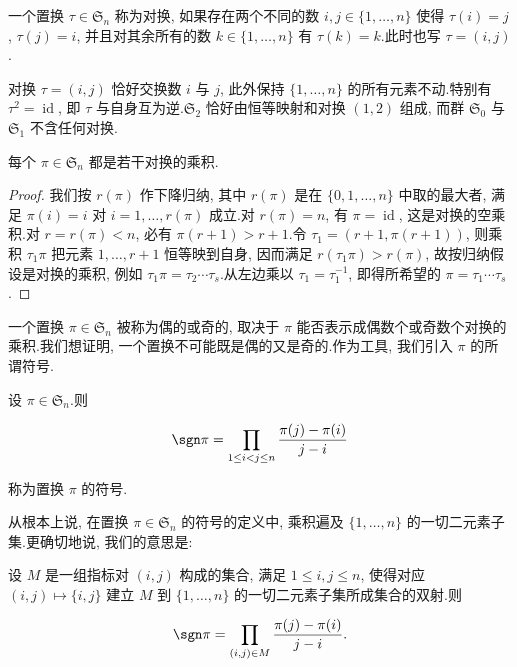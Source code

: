 \begin{definition}\label{def:4.1.2}
一个置换 $\tau \in \mathfrak{S}_n$ 称为对换, 如果存在两个不同的数 $i, j \in \{1, \ldots, n\}$ 使得 $\tau(i) = j$, $\tau(j) = i$, 并且对其余所有的数 $k \in \{1, \ldots, n\}$ 有 $\tau(k) = k$.此时也写 $\tau = (i, j)$.
\end{definition}

对换 $\tau = (i, j)$ 恰好交换数 $i$ 与 $j$, 此外保持 $\{1, \ldots, n\}$ 的所有元素不动.特别有 $\tau^2 = \operatorname{id}$, 即 $\tau$ 与自身互为逆.$\mathfrak{S}_2$ 恰好由恒等映射和对换 $(1, 2)$ 组成, 而群 $\mathfrak{S}_0$ 与 $\mathfrak{S}_1$ 不含任何对换.

\begin{theorem}\label{thm:4.1.3}
每个 $\pi \in \mathfrak{S}_n$ 都是若干对换的乘积.
\end{theorem}

\begin{proof}
我们按 $r(\pi)$ 作下降归纳, 其中 $r(\pi)$ 是在 $\{0, 1, \ldots, n\}$ 中取的最大者, 满足 $\pi(i) = i$ 对 $i = 1, \ldots, r(\pi)$ 成立.对 $r(\pi) = n$, 有 $\pi = \operatorname{id}$, 这是对换的空乘积.对 $r = r(\pi) < n$, 必有 $\pi(r + 1) > r + 1$.令 $\tau_1 = (r + 1, \pi(r + 1))$, 则乘积 $\tau_1 \pi$ 把元素 $1, \ldots, r + 1$ 恒等映到自身, 因而满足 $r(\tau_1 \pi) > r(\pi)$, 故按归纳假设是对换的乘积, 例如 $\tau_1 \pi = \tau_2 \cdots \tau_s$.从左边乘以 $\tau_1 = \tau_1^{-1}$, 即得所希望的 $\pi = \tau_1 \cdots \tau_s$.
\end{proof}

一个置换 $\pi \in \mathfrak{S}_n$ 被称为偶的或奇的, 取决于 $\pi$ 能否表示成偶数个或奇数个对换的乘积.我们想证明, 一个置换不可能既是偶的又是奇的.作为工具, 我们引入 $\pi$ 的所谓符号.

\begin{definition}[置换的符号]\label{def:4.1.4}
设 $\pi \in \mathfrak{S}_n$.则

\[
\sgn \pi = \prod_{1 \leq i < j \leq n} \frac{\pi(j) - \pi(i)}{j - i}
\]

称为置换 $\pi$ 的符号.
\end{definition}

从根本上说, 在置换 $\pi \in \mathfrak{S}_n$ 的符号的定义中, 乘积遍及 $\{1, \ldots, n\}$ 的一切二元素子集.更确切地说, 我们的意思是:

\begin{remark}\label{rem:4.1.5}
设 $M$ 是一组指标对 $(i, j)$ 构成的集合, 满足 $1 \leq i, j \leq n$, 使得对应 $(i, j) \longmapsto \{i, j\}$ 建立 $M$ 到 $\{1, \ldots, n\}$ 的一切二元素子集所成集合的双射.则

\[
\sgn \pi = \prod_{(i, j) \in M} \frac{\pi(j) - \pi(i)}{j - i}.
\]
\end{remark}

